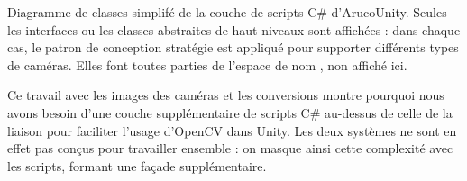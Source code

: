 {%
}{Diagramme de classes simplifé de la couche de scripts C\# d'ArucoUnity. Seules les interfaces ou les classes abstraites de haut niveaux sont affichées : dans chaque cas, le patron de conception stratégie est appliqué pour supporter différents types de caméras. Elles font toutes parties de l'espace de nom , non affiché ici.}

Ce travail avec les images des caméras et les conversions montre pourquoi nous avons besoin d'une couche supplémentaire de scripts C\# au-dessus de celle de la liaison pour faciliter l'usage d'OpenCV dans Unity. Les deux systèmes ne sont en effet pas conçus pour travailler ensemble : on masque ainsi cette complexité avec les scripts, formant une façade supplémentaire.

